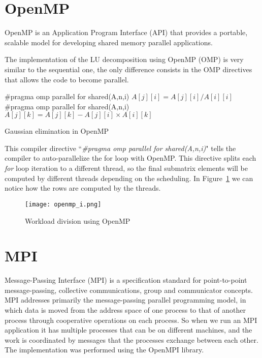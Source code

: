 \section{OpenMP}
OpenMP is an Application Program Interface (API) that provides a portable, scalable model for developing shared memory parallel applications.

The implementation of the LU decomposition using OpenMP (OMP) is very similar to the sequential one, the only difference consists in the OMP directives that allows the code to become parallel.

\begin{algorithm}
\begin{algorithmic}
	\State \#pragma omp parallel for shared(A,n,i)
		\State $A[j][i] = A[j][i] / A[i][i]$ 
	\EndFor
	\State \#pragma omp parallel for shared(A,n,i)
			\State $A[j][k] = A[j][k] - A[j][i] \times A[i][k]$ 
		\EndFor	
	\EndFor
\EndFor
\end{algorithmic}
\caption{Gaussian elimination in OpenMP}
\label{alg:omp_code}
\end{algorithm}

This compiler directive ``\textit{\#pragma omp parallel for shared(A,n,i)}" tells the compiler to auto-parallelize the for loop with OpenMP. This directive splits each \textit{for} loop iteration to a different thread, so the final submatrix elements will be computed by different threads depending on the scheduling. In Figure~\ref{img:omp_workload}  we can notice how the rows are computed by the threads.


\begin{figure}[H]
\centering
\texttt{[image: openmp\_i.png]}
\caption{Workload division using OpenMP}
\label{img:omp_workload}
\end{figure}



\section{MPI}

Message-Passing Interface (MPI) is a specification standard for point-to-point message-passing, collective communications, group and communicator concepts. MPI addresses primarily the message-passing parallel programming model, in which data is moved from the address space of one process to that of another process through cooperative operations on each process. So when we run an MPI application it has multiple processes that can be on different machines, and the work is coordinated by messages that the processes exchange between each other. The implementation was performed using the OpenMPI library.

